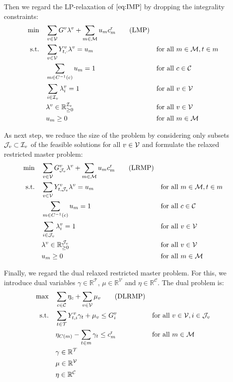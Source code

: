 Then we regard the LP-relaxation of $\eqref{eq:IMP}$ by dropping the integrality constraints:
\begin{align*}
	\min \quad & \sum_{v\in\mathcal{V}}G^v\lambda^v + \sum_{m\in\mathcal{M}}u_mc^{\operatorname{r}}_m \tag{LMP} \label{eq:LMP} \\
	\text{s.t.} \quad & \sum_{v\in\mathcal{V}} Y^v_{t,\cdot}\lambda^v = u_m && \text{for all } m\in\mathcal{M},t\in m \\
	& \sum_{m\in C^{-1}(c)} u_m = 1 && \text{for all } c\in\mathcal{C} \\
	& \sum_{i\in\mathcal{I}_v}\lambda_i^v=1 && \text{for all } v\in\mathcal{V}\\
	& \lambda^v\in\mathbb{R}_{\geq 0}^{\mathcal{I}_v} && \text{for all } v\in\mathcal{V} \\
	& u_m\geq 0 && \text{for all } m\in\mathcal{M}
\end{align*}

As next step, we reduce the size of the problem by considering only subsets $\mathcal{J}_v\subset\mathcal{I}_v$ of the feasible solutions for all $v\in\mathcal{V}$ and formulate the relaxed restricted master problem:
\begin{align*}
	\min \quad & \sum_{v\in\mathcal{V}}G^v_{\mathcal{J}_v}\lambda^v + \sum_{m\in\mathcal{M}}u_mc^{\operatorname{r}}_m \tag{LRMP} \label{eq:LRMP} \\
	\text{s.t.} \quad & \sum_{v\in\mathcal{V}} Y^v_{t,\mathcal{J}_v}\lambda^v = u_m && \text{for all } m\in\mathcal{M},t\in m \\
	& \sum_{m\in C^{-1}(c)} u_m = 1 && \text{for all } c\in\mathcal{C} \\
	& \sum_{i\in\mathcal{J}_v}\lambda_i^v=1 && \text{for all } v\in\mathcal{V}\\
	& \lambda^v\in\mathbb{R}_{\geq 0}^{\mathcal{J}_v} && \text{for all } v\in\mathcal{V} \\
	& u_m\geq 0 && \text{for all } m\in\mathcal{M}
\end{align*}

Finally, we regard the dual relaxed restricted master problem. For this, we introduce dual variables $\gamma\in\mathbb{R}^{\mathcal{T}}$, $\mu\in\mathbb{R}^{\mathcal{V}}$ and $\eta\in\mathbb{R}^{\mathcal{C}}$. The dual problem is:
\begin{align}
	\max \quad & \sum_{c\in\mathcal{C}}\eta_c + \sum_{v\in\mathcal{V}}\mu_v \tag{DLRMP} \label{eq:DLRMP} \\
	\text{s.t.} \quad & \sum_{t\in\mathcal{T}} Y^v_{t,i}\gamma_t + \mu_v \leq G^v_i && \text{for all } v\in\mathcal{V},i\in\mathcal{J}_v \label{eq:DLRMP:vehicle} \\
	& \eta_{C(m)} - \sum_{t\in m}\gamma_t \leq c^{\operatorname{r}}_m && \text{for all } m\in\mathcal{M} \label{eq:DLRMP:route} \\
	& \gamma\in\mathbb{R}^{\mathcal{T}} \nonumber \\
	& \mu\in\mathbb{R}^{\mathcal{V}} \nonumber \\
	& \eta\in\mathbb{R}^{\mathcal{C}} \nonumber
\end{align}

